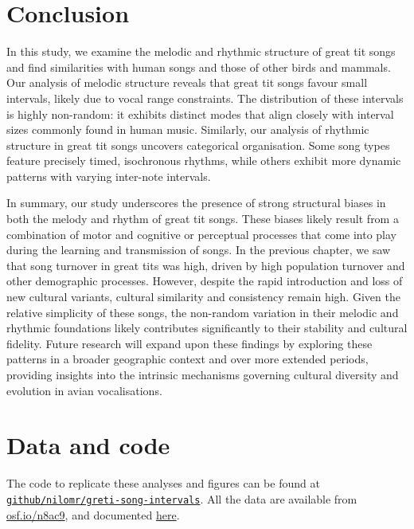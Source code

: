 \section{Conclusion} 

In this study, we examine the melodic and rhythmic structure of great tit songs and find similarities with human songs and those of other birds and mammals. Our analysis of melodic structure reveals that great tit songs favour small intervals, likely due to vocal range constraints. The distribution of these intervals is highly non-random: it exhibits distinct modes that align closely with interval sizes commonly found in human music. Similarly, our analysis of rhythmic structure in great tit songs uncovers categorical organisation. Some song types feature precisely timed, isochronous rhythms, while others exhibit more dynamic patterns with varying inter-note intervals.

In summary, our study underscores the presence of strong structural biases in both the melody and rhythm of great tit songs. These biases likely result from a combination of motor and cognitive or perceptual processes that come into play during the learning and transmission of songs. In the previous chapter, we saw that song turnover in great tits was high, driven by high population turnover and other demographic processes. However, despite the rapid introduction and loss of new cultural variants, cultural similarity and consistency remain high. Given the relative simplicity of these songs, the non-random variation in their melodic and rhythmic foundations likely contributes significantly to their stability and cultural fidelity. Future research will expand upon these findings by exploring these patterns in a broader geographic context and over more extended periods, providing insights into the intrinsic mechanisms governing cultural diversity and evolution in avian vocalisations.

\section{Data and code}

The code to replicate these analyses and figures can be found at \href{https://github.com/nilomr/greti-song-intervals}{\nolinkurl{github/nilomr/greti-song-intervals}}. All the data are available from \href{https://osf.io/n8ac9}{osf.io/n8ac9}, and documented \href{https://nilomr.github.io/great-tit-hits/}{here}.

